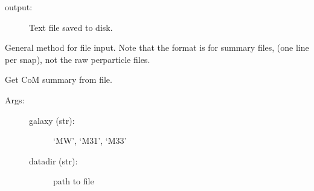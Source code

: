 \documentclass[letterpaper,10pt,english]{sphinxmanual}
\begin{document}
\begin{fulllineitems}
\begin{fulllineitems}
\begin{description}
\begin{description}
\end{description}

\item[{output: }] \leavevmode
Text file saved to disk.

\end{description}

\end{fulllineitems}


\begin{fulllineitems}
\label{\detokenize{timecourse:galaxy.timecourse.TimeCourse.write_rel_motion}}
\end{fulllineitems}


\begin{fulllineitems}
\label{\detokenize{timecourse:galaxy.timecourse.TimeCourse.read_file}}
General method for file input. Note that the format is for summary files,
(one line per snap), not the raw per\sphinxhyphen{}particle files.

\end{fulllineitems}


\begin{fulllineitems}
\label{\detokenize{timecourse:galaxy.timecourse.TimeCourse.read_com_file}}
Get CoM summary from file.
\begin{description}
\item[{Args:}] \leavevmode\begin{description}
\item[{galaxy (str): }] \leavevmode
‘MW’, ‘M31’, ‘M33’

\item[{datadir (str):}] \leavevmode
path to file


\end{description}
\end{description}
\end{fulllineitems}
\end{fulllineitems}
\end{document}
